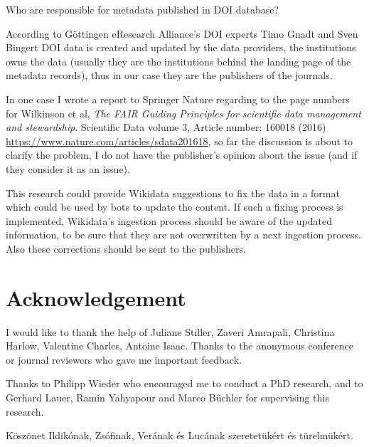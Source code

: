Who are responsible for metadata published in DOI database?

According to Göttingen eResearch Alliance's DOI experts Timo Gnadt and Sven Bingert DOI data is created and updated by the data providers, the institutions owns the data (usually they are the institutions behind the landing page of the metadata records), thus in our case they are the publishers of the journals.

In one case I wrote a report to Springer Nature regarding to the page numbers for Wilkinson et al, \emph{The FAIR Guiding Principles for scientific data management and stewardship}. Scientific Data volume 3, Article number: 160018 (2016) \url{https://www.nature.com/articles/sdata201618}, so far the discussion is about to clarify the problem, I do not have the publisher's opinion about the issue (and if they consider it as an issue).

This research could provide Wikidata suggestions to fix the data in a format which could be used by bots to update the content. If such a fixing process is implemented, Wikidata's ingestion process should be aware of the updated information, to be sure that they are not overwritten by a next ingestion process. Also these corrections should be sent to the publishers.

\section{Acknowledgement}

I would like to thank the help of Juliane Stiller, Zaveri Amrapali, Christina Harlow, Valentine Charles, Antoine Isaac. Thanks to the anonymous conference or journal reviewers who gave me important feedback.

Thanks to Philipp Wieder who encouraged me to conduct a PhD research, and to Gerhard Lauer, Ramin Yahyapour and Marco Büchler for supervising this research.

Köszönet Ildikónak, Zsófinak, Verának és Lucának szeretetükért és türelmükért.
